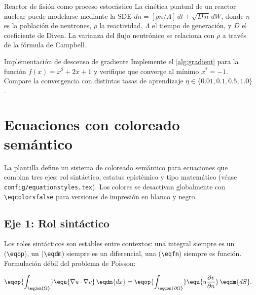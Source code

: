 \begin{estrella}{Reactor de fisión como proceso estocástico}
La cinética puntual de un reactor nuclear puede modelarse mediante la SDE
$dn = [\rho n / \Lambda]\,dt + \sqrt{D\,n}\,dW$,
donde $n$ es la población de neutrones, $\rho$ la reactividad,
$\Lambda$ el tiempo de generación, y $D$ el coeficiente de Diven.
La varianza del flujo neutrónico se relaciona con $\rho$ a través de la
fórmula de Campbell.
\end{estrella}

\begin{ejerciciocomp}{Implementación de descenso de gradiente}
Implemente el \cref{alg:gradient} para la función
$f(x) = x^2 + 2x + 1$ y verifique que converge al mínimo $x^* = -1$.
Compare la convergencia con distintas tasas de aprendizaje
$\eta \in \{0.01, 0.1, 0.5, 1.0\}$.
\end{ejerciciocomp}


\section{Ecuaciones con coloreado semántico}
\label{sec:ecuaciones}

La plantilla define un sistema de coloreado semántico para ecuaciones
que combina tres ejes: rol sintáctico, estatus epistémico y tipo matemático
(véase \texttt{config/\allowbreak equation\-styles.tex}).
Los colores se desactivan globalmente con
\texttt{\textbackslash eqcolorsfalse} para versiones de impresión en
blanco y negro.




\subsection{Eje 1: Rol sintáctico}

Los roles sintácticos son estables entre contextos: una integral siempre es
un   (\texttt{\textbackslash eqop}), un  (\texttt{\textbackslash eqdm}) siempre es un diferencial, una
 (\texttt{\textbackslash eqfn})  siempre es función. Formulación débil del problema de Poisson:

\begin{equation}
\label{eq:poisson-weak}
\eqop{\int_{\eqdom{\Omega}}}
\equ{\nabla u \cdot \nabla v}
\, \eqdm{dx}
=
\eqop{\int_{\eqdom{\partial\Omega}}}
\equ{u \frac{\partial v}{\partial n}}
\, \eqdm{dS}.
\end{equation}

